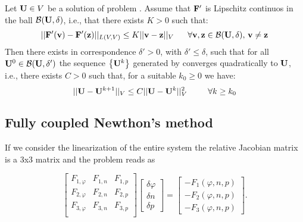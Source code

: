 \begin{Teorema}
\label{theorem: newton convergence}
Let  $\mathbf{U}\in V$ be a solution of problem . Assume that $\mathbf{F'}$ is Lipschitz continuos in the ball $\mathcal{B}(\mathbf{U},\delta)$, i.e., that there exists  $K>0$ such that:
\begin{equation}
||\vect{F'}(\vect{v})-\vect{F'}(\vect{z})||_{L(V,V)} \leq K ||\vect{v}-\vect{z}||_V \psp{10} \forall \vect{v},\vect{z} \in \mathcal{B}(\vect{U},\delta), \, \vect{v}\neq \vect{z}
\end{equation}
Then there exists in correspondence $\delta '>0$, with $\delta '\leq\delta$, such that for all $\mathbf{U}^0 \in \mathcal{B}(\mathbf{U},\delta ')$ the sequence $\left\{ \mathbf{U}^k \right\}$ generated by  converges quadratically to $\mathbf{U}$, i.e., there exists $C>0$ such that, for a suitable $k_0\geq 0$ we have:
\begin{equation}
\label{eq: convergece newton}
||\vect{U}-\vect{U}^{k+1}||_V\leq C||\vect{U}-\vect{U}^k||_V^2 \psp{15} \forall k\geq k_0
\end{equation}
\end{Teorema}


\subsection{Fully coupled Newthon's method}


If we consider the linearization of the entire system  the relative Jacobian matrix is a 3x3 matrix and the problem reads as

\begin{equation}
\left[
\begin{array}{ccc}
F_{1,\varphi} & F_{1,n} & F_{1,p} \\
F_{2,\varphi} & F_{2,n} & F_{2,p} \\
F_{3,\varphi} & F_{3,n} & F_{3,p} \\
\end{array}
\right]
\left[
\begin{array}{c}
\delta \varphi  \\
\delta n  \\
\delta p 
\end{array}
\right]
=
\left[
\begin{array}{c}
-F_1(\varphi,n,p) \\
-F_2(\varphi,n,p)\\
-F_3(\varphi,n,p)
\end{array}
\right].
\end{equation}


